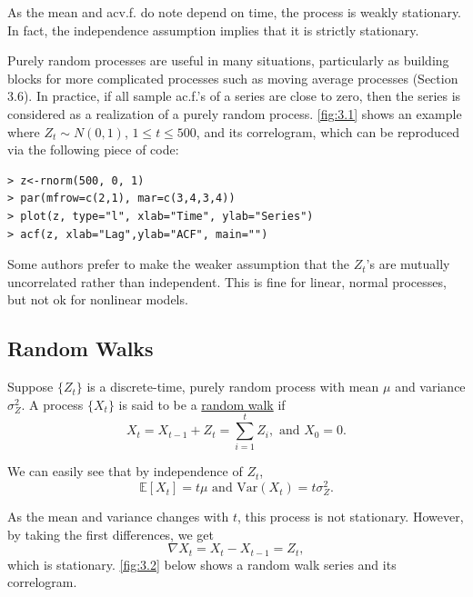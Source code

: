 As the mean and acv.f. do note depend on time, the process is weakly stationary. In fact, the independence 
assumption implies that it is strictly stationary.

Purely random processes are useful in many situations, particularly as building blocks for more complicated 
processes such as moving average processes (Section 3.6). In practice, if all sample ac.f.'s of a series are 
close to zero, then the series is considered as a realization of a purely random process. \cref{fig:3.1} shows 
an example where $Z_t \sim N(0, 1)$, $1 \leq t \leq 500$, and its correlogram, which can be reproduced via the 
following piece of code:
\begin{verbatim}
> z<-rnorm(500, 0, 1)
> par(mfrow=c(2,1), mar=c(3,4,3,4))
> plot(z, type="l", xlab="Time", ylab="Series")
> acf(z, xlab="Lag",ylab="ACF", main="")
\end{verbatim}

Some authors prefer to make the weaker assumption that the $Z_t$'s are mutually uncorrelated rather than 
independent. This is fine for linear, normal processes, but not ok for nonlinear models. 



\subsection{Random Walks}
\begin{definition*}[]
Suppose $\{ Z_t \}$ is a discrete-time, purely random process with mean $\mu$ and variance $\sigma_Z^2$. A 
process $\{ X_t \}$ is said to be a \underline{random walk} if 
\[ X_t = X_{t-1} + Z_t = \sum_{i = 1}^{t} Z_i, \text{ and } X_0 = 0. \]
\end{definition*}

We can easily see that by independence of $Z_t$, 
\[ \mathbb{E}\left[ X_t \right] = t \mu \text{ and } \mathrm{Var}(X_t) = t \sigma_Z^2. \]

As the mean and variance changes with $t$, this process is not stationary. However, by taking the first 
differences, we get 
\[ \nabla X_t = X_t - X_{t-1} = Z_t,  \]
which is stationary. \cref{fig:3.2} below shows a random walk series and its correlogram. 

